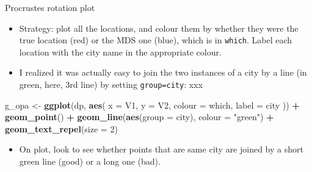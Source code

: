 \documentclass[ignorenonframetext,]{beamer}
\newenvironment{Shaded}{\begin{snugshade}}{\end{snugshade}}
\newcommand{\DataTypeTok}[1]{\textcolor[rgb]{0.13,0.29,0.53}{#1}}
\newcommand{\DecValTok}[1]{\textcolor[rgb]{0.00,0.00,0.81}{#1}}
\newcommand{\KeywordTok}[1]{\textcolor[rgb]{0.13,0.29,0.53}{\textbf{#1}}}
\newcommand{\NormalTok}[1]{#1}
\newcommand{\OperatorTok}[1]{\textcolor[rgb]{0.81,0.36,0.00}{\textbf{#1}}}
\newcommand{\StringTok}[1]{\textcolor[rgb]{0.31,0.60,0.02}{#1}}
\providecommand{\tightlist}{%
  \setlength{\itemsep}{0pt}\setlength{\parskip}{0pt}}
\begin{document}
\begin{frame}[fragile]{Procrustes rotation plot}
\protect\hypertarget{procrustes-rotation-plot}{}

\begin{itemize}
\item
  Strategy: plot all the locations, and colour them by whether they were
  the true location (red) or the MDS one (blue), which is in
  \texttt{which}. Label each location with the city name in the
  appropriate colour.
\item
  I realized it was actually easy to join the two instances of a city by
  a line (in green, here, 3rd line) by setting \texttt{group=city}: xxx
\end{itemize}

\footnotesize

\begin{Shaded}
\begin{Highlighting}[]
\NormalTok{g_opa <-}\StringTok{ }\KeywordTok{ggplot}\NormalTok{(dp, }\KeywordTok{aes}\NormalTok{(}
  \DataTypeTok{x =}\NormalTok{ V1, }\DataTypeTok{y =}\NormalTok{ V2, }\DataTypeTok{colour =}\NormalTok{ which,}
  \DataTypeTok{label =}\NormalTok{ city}
\NormalTok{)) }\OperatorTok{+}\StringTok{ }\KeywordTok{geom_point}\NormalTok{() }\OperatorTok{+}
\StringTok{  }\KeywordTok{geom_line}\NormalTok{(}\KeywordTok{aes}\NormalTok{(}\DataTypeTok{group =}\NormalTok{ city), }\DataTypeTok{colour =} \StringTok{"green"}\NormalTok{) }\OperatorTok{+}
\StringTok{  }\KeywordTok{geom_text_repel}\NormalTok{(}\DataTypeTok{size =} \DecValTok{2}\NormalTok{)}
\end{Highlighting}
\end{Shaded}

\normalsize

\begin{itemize}
\tightlist
\item
  On plot, look to see whether points that are same city are joined by a
  short green line (good) or a long one (bad).
\end{itemize}

\end{frame}
\end{document}
